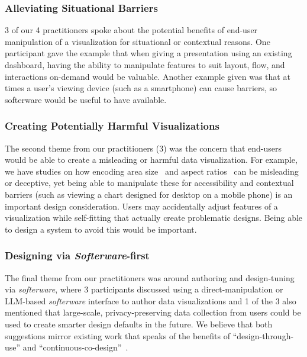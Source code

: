 \documentclass[12pt]{cmuthesis}
\begin{document}
\subsubsection{Alleviating Situational Barriers}
3 of our 4 practitioners spoke about the potential benefits of end-user manipulation of a visualization for situational or contextual reasons. One participant gave the example that when giving a presentation using an existing dashboard, having the ability to manipulate features to suit layout, flow, and interactions on-demand would be valuable. Another example given was that at times a user's viewing device (such as a smartphone) can cause barriers, so softerware would be useful to have available.


\subsubsection{Creating Potentially Harmful Visualizations}
The second theme from our practitioners (3) was the concern that end-users would be able to create a misleading or harmful data visualization. For example, we have studies on how encoding area size~\cite{Lo} and aspect ratios~\cite{Ceja} can be misleading or deceptive, yet being able to manipulate these for accessibility and contextual barriers (such as viewing a chart designed for desktop on a mobile phone) is an important design consideration. Users may accidentally adjust features of a visualization while self-fitting that actually create problematic designs. Being able to design a system to avoid this would be important.


\subsubsection{Designing via \textit{Softerware}-first}
The final theme from our practitioners was around authoring and design-tuning via \textit{softerware}, where 3 participants discussed using a direct-manipulation or LLM-based \textit{softerware} interface to author data visualizations and 1 of the 3 also mentioned that large-scale, privacy-preserving data collection from users could be used to create smarter design defaults in the future. We believe that both suggestions mirror existing work that speaks of the benefits of ``design-through-use'' and ``continuous-co-design''~\cite{Maceli2013}.
\end{document}
